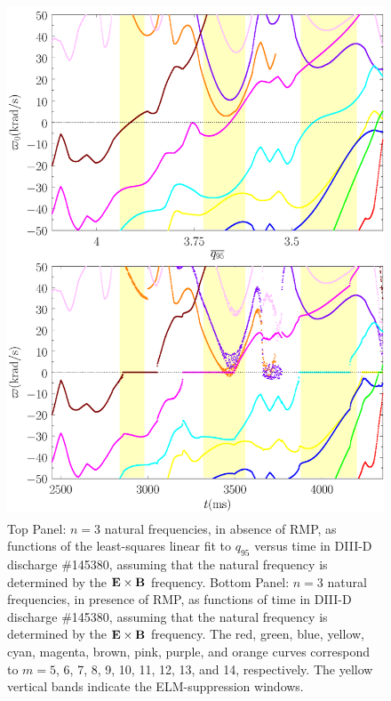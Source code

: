 \documentclass[12pt,prb,aps]{revtex4-1}
\begin{document}
\begin{figure}
\includegraphics[height=6in]{fig2.pdf}
\caption{Top Panel: $n=3$ natural frequencies, in absence of RMP, as functions of the least-squares linear fit to $q_{95}$ versus time
in   DIII-D discharge \#145380, assuming that the natural frequency is determined by the ${\bf E}\times {\bf B}$
frequency.
Bottom Panel:  $n=3$ natural frequencies, in presence of RMP, as functions of time
in   DIII-D discharge \#145380, assuming that the natural frequency is determined by the ${\bf E}\times {\bf B}$
frequency. The red, green, blue, yellow, cyan, magenta, brown, pink,
purple, and orange  curves correspond to $m=5$, 6, 7, 8, 9, 10, 11, 12, 13, and 14, respectively. The yellow vertical bands indicate the ELM-suppression windows.} \label{fig2}
\end{figure}
\end{document}
